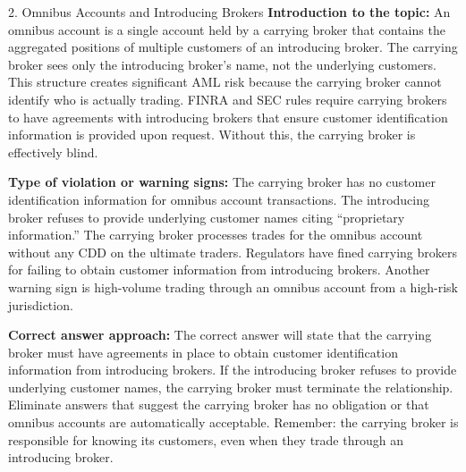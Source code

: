 \documentclass[11pt,a4paper]{beamer}
\begin{document}
\begin{frame}{2. Omnibus Accounts and Introducing Brokers}
\tiny
\noindent\textbf{Introduction to the topic:} An omnibus account is a single account held by a carrying broker that contains the aggregated positions of multiple customers of an introducing broker. The carrying broker sees only the introducing broker's name, not the underlying customers. This structure creates significant AML risk because the carrying broker cannot identify who is actually trading. FINRA and SEC rules require carrying brokers to have agreements with introducing brokers that ensure customer identification information is provided upon request. Without this, the carrying broker is effectively blind.

\vspace{0.1cm}
\noindent\textbf{Type of violation or warning signs:} The carrying broker has no customer identification information for omnibus account transactions. The introducing broker refuses to provide underlying customer names citing “proprietary information.” The carrying broker processes trades for the omnibus account without any CDD on the ultimate traders. Regulators have fined carrying brokers for failing to obtain customer information from introducing brokers. Another warning sign is high-volume trading through an omnibus account from a high-risk jurisdiction.

\vspace{0.1cm}
\noindent\textbf{Correct answer approach:} The correct answer will state that the carrying broker must have agreements in place to obtain customer identification information from introducing brokers. If the introducing broker refuses to provide underlying customer names, the carrying broker must terminate the relationship. Eliminate answers that suggest the carrying broker has no obligation or that omnibus accounts are automatically acceptable. Remember: the carrying broker is responsible for knowing its customers, even when they trade through an introducing broker.
\end{frame}
\end{document}
